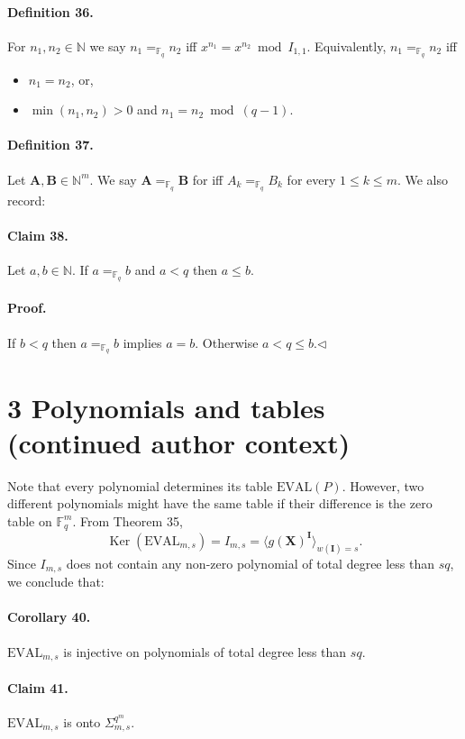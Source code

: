 \paragraph{Definition 36.} For $n_1,n_2\in\mathbb N$ we say $n_1=_{\mathbb F_q}n_2$ iff $x^{n_1}=x^{n_2}\bmod I_{1,1}$. Equivalently, $n_1=_{\mathbb F_q}n_2$ iff
\begin{itemize}
\item $n_1=n_2$, or,
\item $\min(n_1,n_2)>0$ and $n_1=n_2\bmod(q-1)$.
\end{itemize}
\paragraph{Definition 37.} Let $\boldsymbol A,\boldsymbol B\in\mathbb N^m$. We say $\boldsymbol A=_{\mathbb F_q}\boldsymbol B$ for iff $A_k=_{\mathbb F_q}B_k$ for every $1\leq k\leq m$.
We also record:
\paragraph{Claim 38.} Let $a,b\in\mathbb N$. If $a=_{\mathbb F_q}b$ and $a<q$ then $a\leq b$.
\paragraph{Proof.} If $b<q$ then $a=_{\mathbb F_q}b$ implies $a=b$. Otherwise $a<q\leq b$.\hfill$\triangleleft$
\section*{3 Polynomials and tables (continued author context)}
Note that every polynomial determines its table $\mathrm{EVAL}(P)$. However, two different polynomials might have the same table if their difference is the zero table on $\mathbb F_q^m$. From Theorem 35,
\[\operatorname{Ker}(\mathrm{EVAL}_{m,s})=I_{m,s}=\langle g(\boldsymbol X)^{\boldsymbol I}\rangle_{w(\boldsymbol I)=s}.\]
Since $I_{m,s}$ does not contain any non-zero polynomial of total degree less than $sq$, we conclude that:
\paragraph{Corollary 40.} $\mathrm{EVAL}_{m,s}$ is injective on polynomials of total degree less than $sq$.
\paragraph{Claim 41.} $\mathrm{EVAL}_{m,s}$ is onto $\Sigma_{m,s}^{q^m}$.
